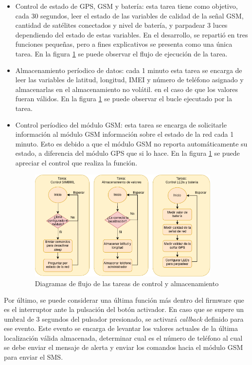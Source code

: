 {\begin{itemize}
		\item Control de estado de GPS, GSM y batería: esta tarea tiene como objetivo, cada 30 segundos, leer el estado de las variables de calidad de la señal GSM, cantidad de satélites conectados y nivel de batería, y parpadear 3 luces dependiendo del estado de estas variables. En el desarrollo, se repartió en tres funciones pequeñas, pero a fines explicativos se presenta como una única tarea. En la figura \ref{fig:esp32:tasks3} se puede observar el flujo de ejecución de la tarea.
		\item Almacenamiento períodico de datos: cada 1 minuto esta tarea se encarga de leer las variables de latitud, longitud, IMEI y número de teléfono asignado y almacenarlas en el almacenamiento no volátil. en el caso de que los valores fueran válidos. En la figura \ref{fig:esp32:tasks3} se puede observar el bucle ejecutado por la tarea.
		\item Control períodico del módulo GSM: esta tarea se encarga de solicitarle información al módulo GSM información sobre el estado de la red cada 1 minuto. Esto es debido a que el módulo GSM no reporta automáticamente su estado, a diferencia del módulo GPS que si lo hace.  En la figura \ref{fig:esp32:tasks3} se puede apreciar el control que realiza la función.
		
				\begin{figure}[H]
	\centering
	\includegraphics[width=0.9\textwidth]{./Figures/esp32-tasks3.png}
	\caption{Diagramas de flujo de las tareas de control y almacenamiento}
	\label{fig:esp32:tasks3}
\end{figure}

\end{itemize}


Por último, se puede considerar una última función más dentro del firmware que es el interruptor ante la pulsación del botón activador. En caso que se supere un umbral de 3 segundos del pulsador presionado, se activará \textit{callback} definido para ese evento. Este evento se encarga de levantar los valores actuales de la última localización válida almacenada, determinar cual es el número de teléfono al cual se debe enviar el mensaje de alerta y enviar los comandos hacia el módulo GSM para enviar el SMS. 

}
